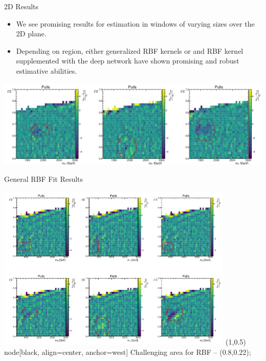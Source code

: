 \documentclass[10pt]{beamer}
\begin{document}
\begin{frame}{2D Results}
  \begin{itemize}
  \item We see promising results for estimation in windows of varying sizes over the 2D plane. 
  \item Depending on region, either generalized RBF kernels or and RBF kernel supplemented with the deep network have shown promising and robust estimative abilities.
  \end{itemize}

  \begin{center}
    \includegraphics[width=\textwidth]{figures/nn_results_1} 
  \end{center}
\end{frame}

\begin{frame}{General RBF Fit Results}
  \begin{center}
    \begin{annotimage}{\includegraphics[width=0.85\textwidth]{figures/grbf_results}}
       (1,0.5) node[black, align=center, anchor=west] {{\tiny Challenging area for RBF}} -- (0.8,0.22);
    \end{annotimage}
  \end{center}
\end{frame}
\end{document}
